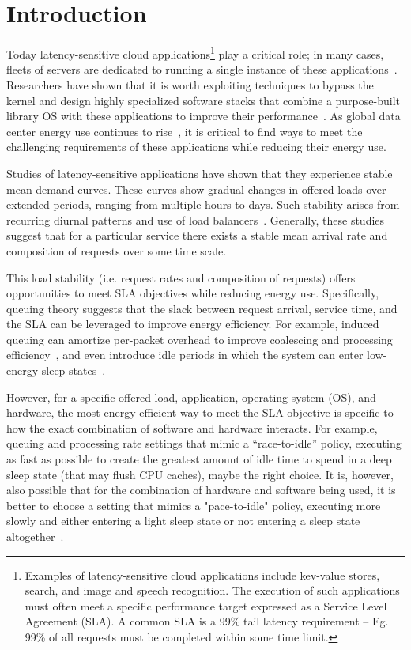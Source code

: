 \section{Introduction}
Today latency-sensitive cloud applications\footnote{Examples of latency-sensitive cloud applications include kev-value stores, search, and image and speech recognition.  The execution of such applications must often meet a specific performance target expressed as a Service Level Agreement (SLA). A common SLA is a 99\% tail latency requirement -- Eg. 99\% of all requests must be completed within some time limit.} 
play a critical role; in many cases, fleets of servers are dedicated to running a single instance of these applications~\cite{ixcp, heracles, PerAppPower, twine, twittermcd}. 
Researchers have shown that it is worth exploiting techniques to bypass the kernel and design highly specialized software stacks that combine a purpose-built library OS with these applications to improve their performance~\cite{ix, arrakis, zygos, shenango, rumpkernel, aliraza, unikernels, scalingmcdfacebook, arachne, mtcp, sandstorm, affinityaccept, flexnic, mica, seda}. 
As global data center energy use continues to rise~\cite{gupta2020chasing, NLP-energy,warehouse-power,nature1}, it is critical to find ways to meet the challenging requirements of these applications while reducing their energy use. 

Studies of latency-sensitive applications have shown that they experience stable mean demand curves.  
These curves show gradual changes in offered loads over extended periods, ranging from multiple hours to days. Such stability arises from recurring diurnal patterns and use of load balancers~\cite{scalingmcdfacebook, twittermcd, netflixmcd, redditmcd}.
Generally, these studies suggest that for a particular service there exists a stable mean arrival rate and composition of requests over some time scale.

This load stability (i.e. request rates and composition of requests) offers opportunities to meet SLA objectives while reducing energy use. Specifically, queuing theory suggests that the slack between request arrival, service time, and the SLA can be leveraged to improve energy efficiency. For example, induced queuing can amortize per-packet overhead to improve coalescing and processing efficiency~\cite{mootaz}, and even introduce idle periods in which the system can enter low-energy sleep states~\cite{slowdownorsleep}.

However, for a specific offered load, application, operating system (OS), and hardware, the most energy-efficient way to meet the SLA objective is specific to how the exact combination of software and hardware interacts.  
For example, queuing and processing rate settings that mimic a ``race-to-idle'' policy, executing as fast as possible to create the greatest amount of idle time to spend in a deep sleep state (that may flush CPU caches), maybe the right choice. 
It is, however, also possible that for the combination of hardware and software being used, it is better to choose a setting that mimics a "pace-to-idle" policy, executing more slowly and either entering a light sleep state or not entering a sleep state altogether~\cite{pacingtoidle}.  

